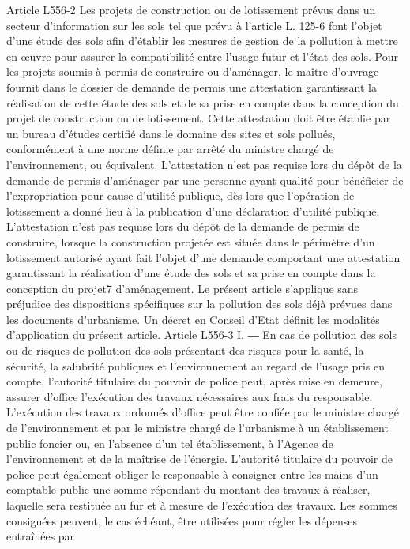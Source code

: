 \documentclass[11pt,a4paper]{report}
\begin{document}
	Article L556-2
	Les projets de construction ou de lotissement prévus dans un secteur d'information sur les sols tel que prévu à
	l'article L. 125-6 font l'objet d'une étude des sols afin d'établir les mesures de gestion de la pollution à mettre en
	œuvre pour assurer la compatibilité entre l'usage futur et l'état des sols.
	Pour les projets soumis à permis de construire ou d'aménager, le maître d'ouvrage fournit dans le dossier de
	demande de permis une attestation garantissant la réalisation de cette étude des sols et de sa prise en compte
	dans la conception du projet de construction ou de lotissement. Cette attestation doit être établie par un bureau
	d'études certifié dans le domaine des sites et sols pollués, conformément à une norme définie par arrêté du
	ministre chargé de l'environnement, ou équivalent.
	L'attestation n'est pas requise lors du dépôt de la demande de permis d'aménager par une personne ayant
	qualité pour bénéficier de l'expropriation pour cause d'utilité publique, dès lors que l'opération de lotissement a
	donné lieu à la publication d'une déclaration d'utilité publique.
	L'attestation n'est pas requise lors du dépôt de la demande de permis de construire, lorsque la construction
	projetée est située dans le périmètre d'un lotissement autorisé ayant fait l'objet d'une demande comportant une
	attestation garantissant la réalisation d'une étude des sols et sa prise en compte dans la conception du projet7
	d'aménagement.
	Le présent article s'applique sans préjudice des dispositions spécifiques sur la pollution des sols déjà prévues
	dans les documents d'urbanisme.
	Un décret en Conseil d'Etat définit les modalités d'application du présent article.
	Article L556-3
	I. ― En cas de pollution des sols ou de risques de pollution des sols présentant des risques pour la santé, la
	sécurité, la salubrité publiques et l'environnement au regard de l'usage pris en compte, l'autorité titulaire du
	pouvoir de police peut, après mise en demeure, assurer d'office l'exécution des travaux nécessaires aux frais du
	responsable. L'exécution des travaux ordonnés d'office peut être confiée par le ministre chargé de
	l'environnement et par le ministre chargé de l'urbanisme à un établissement public foncier ou, en l'absence d'un
	tel établissement, à l'Agence de l'environnement et de la maîtrise de l'énergie. L'autorité titulaire du pouvoir de
	police peut également obliger le responsable à consigner entre les mains d'un comptable public une somme
	répondant du montant des travaux à réaliser, laquelle sera restituée au fur et à mesure de l'exécution des
	travaux. Les sommes consignées peuvent, le cas échéant, être utilisées pour régler les dépenses entraînées par
\end{document}
